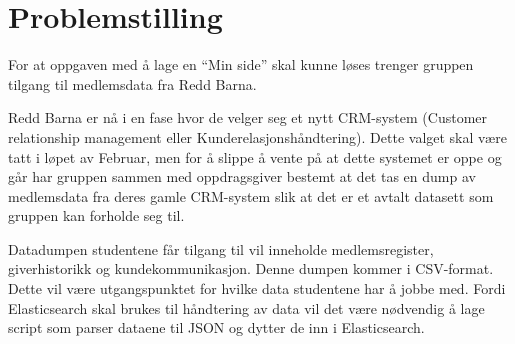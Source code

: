 \chapter{Problemstilling}
For at oppgaven med å lage en ``Min side'' skal kunne løses trenger gruppen tilgang til medlemsdata fra Redd Barna.

Redd Barna er nå i en fase hvor de velger seg et nytt CRM-system (Customer relationship management eller Kunderelasjonshåndtering). Dette valget skal være tatt i løpet av Februar, men for å slippe å vente på at dette systemet er oppe og går har gruppen sammen med oppdragsgiver bestemt at det tas en dump av medlemsdata fra deres gamle CRM-system slik at det er et avtalt datasett som gruppen kan forholde seg til. 

Datadumpen studentene får tilgang til vil inneholde medlemsregister, giverhistorikk og kundekommunikasjon. Denne dumpen kommer i CSV-format. Dette vil være utgangspunktet for hvilke data studentene har å jobbe med. Fordi Elasticsearch skal brukes til håndtering av data vil det være nødvendig å lage script som parser dataene til JSON og dytter de inn i Elasticsearch.
